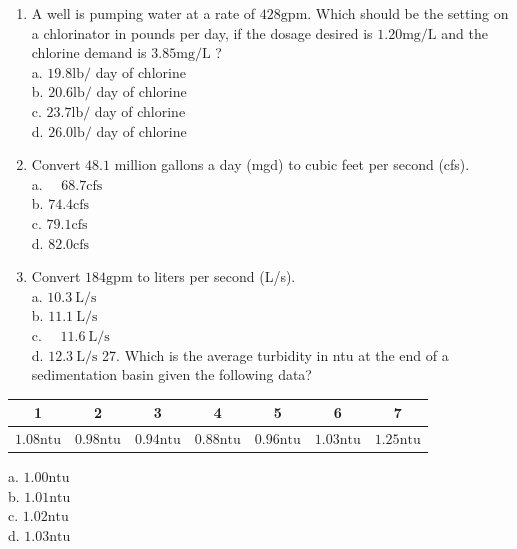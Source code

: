 \documentclass[10pt]{article}
\begin{document}
\begin{enumerate}
  \item A well is pumping water at a rate of $428 \mathrm{gpm}$. Which should be the setting on a chlorinator in pounds per day, if the dosage desired is $1.20 \mathrm{mg} / \mathrm{L}$ and the chlorine demand is $3.85 \mathrm{mg} / \mathrm{L}$ ?\\
a. $19.8 \mathrm{lb} /$ day of chlorine\\
b. $20.6 \mathrm{lb} /$ day of chlorine\\
c. $23.7 \mathrm{lb} /$ day of chlorine\\
d. $26.0 \mathrm{lb} /$ day of chlorine

  \item Convert $48.1$ million gallons a day (mgd) to cubic feet per second (cfs).\\
a. $\quad 68.7 \mathrm{cfs}$\\
b. $74.4 \mathrm{cfs}$\\
c. $79.1 \mathrm{cfs}$\\
d. $82.0 \mathrm{cfs}$

  \item Convert $184 \mathrm{gpm}$ to liters per second (L/s).\\
a. $10.3 \mathrm{~L} / \mathrm{s}$\\
b. $11.1 \mathrm{~L} / \mathrm{s}$\\
c. $\quad 11.6 \mathrm{~L} / \mathrm{s}$\\
d. $12.3 \mathrm{~L} / \mathrm{s}$ 27. Which is the average turbidity in ntu at the end of a sedimentation basin given the following data?

\end{enumerate}

\begin{tabular}{|c|c|c|c|c|c|c|}
\hline
1 & 2 & 3 & 4 & 5 & 6 & 7 \\
\hline
$1.08 \mathrm{ntu}$ & $0.98 \mathrm{ntu}$ & $0.94 \mathrm{ntu}$ & $0.88 \mathrm{ntu}$ & $0.96 \mathrm{ntu}$ & $1.03 \mathrm{ntu}$ & $1.25 \mathrm{ntu}$ \\
\hline
\end{tabular}

a. $1.00 \mathrm{ntu}$\\
b. $1.01 \mathrm{ntu}$\\
c. $1.02 \mathrm{ntu}$\\
d. $1.03 \mathrm{ntu}$
\end{document}
